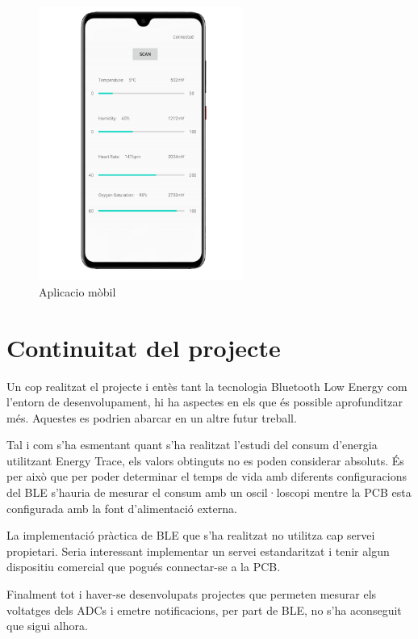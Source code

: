\begin{figure}[h]
	\begin{center}
		\includegraphics[width=0.6\textwidth]{./images/captura_app_borde.png}
		\caption{Aplicacio mòbil}
	\end{center}
	\label{captura_app}
\end{figure}

\newpage
\section{Continuitat del projecte}
Un cop realitzat el projecte i entès tant la tecnologia Bluetooth Low Energy com l'entorn de desenvolupament, hi ha aspectes en els que és possible aprofunditzar més.
Aquestes es podrien abarcar en un altre futur treball.

Tal i com s'ha esmentant quant s'ha realitzat l'estudi del consum d'energia utilitzant Energy Trace, els valors obtinguts no es poden considerar absoluts.
És per això que per poder determinar el temps de vida amb diferents configuracions del BLE s'hauria de mesurar el consum amb un oscil·loscopi mentre la PCB esta configurada amb la font d'alimentació externa.

La implementació pràctica de BLE que s'ha realitzat no utilitza cap servei propietari.
Seria interessant implementar un servei estandaritzat i tenir algun dispositiu comercial que pogués connectar-se a la PCB.

Finalment tot i haver-se desenvolupats projectes que permeten mesurar els voltatges dels ADCs i emetre notificacions, per part de BLE, no s'ha aconseguit que sigui alhora.

